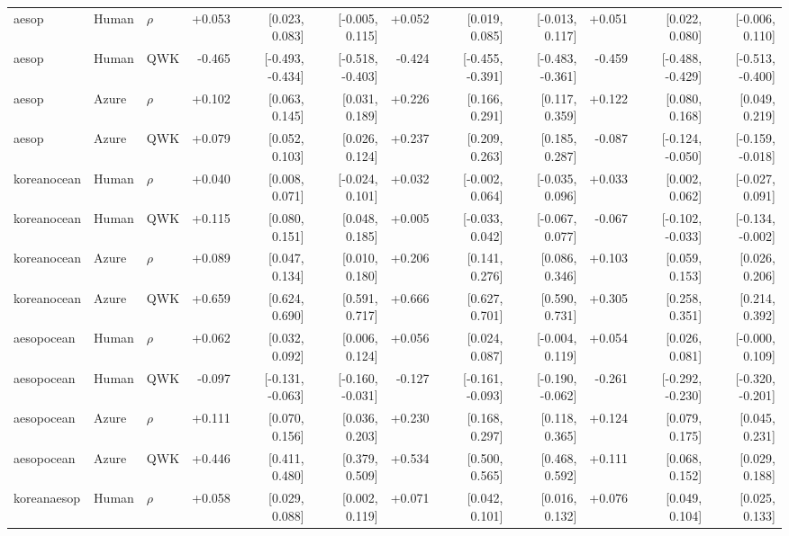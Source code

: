 \begin{landscape}
\begin{longtable}{@{}lllrrrrrrrrr@{}}
\addlinespace[2pt]
aesop & Human & $\rho$ & +0.053 & [0.023, 0.083] & [-0.005, 0.115] & +0.052 & [0.019, 0.085] & [-0.013, 0.117] & +0.051 & [0.022, 0.080] & [-0.006, 0.110]\\
aesop & Human & QWK & -0.465 & [-0.493, -0.434] & [-0.518, -0.403] & -0.424 & [-0.455, -0.391] & [-0.483, -0.361] & -0.459 & [-0.488, -0.429] & [-0.513, -0.400]\\
aesop & Azure & $\rho$ & +0.102 & [0.063, 0.145] & [0.031, 0.189] & +0.226 & [0.166, 0.291] & [0.117, 0.359] & +0.122 & [0.080, 0.168] & [0.049, 0.219]\\
aesop & Azure & QWK & +0.079 & [0.052, 0.103] & [0.026, 0.124] & +0.237 & [0.209, 0.263] & [0.185, 0.287] & -0.087 & [-0.124, -0.050] & [-0.159, -0.018]\\
\addlinespace[2pt]
koreanocean & Human & $\rho$ & +0.040 & [0.008, 0.071] & [-0.024, 0.101] & +0.032 & [-0.002, 0.064] & [-0.035, 0.096] & +0.033 & [0.002, 0.062] & [-0.027, 0.091]\\
koreanocean & Human & QWK & +0.115 & [0.080, 0.151] & [0.048, 0.185] & +0.005 & [-0.033, 0.042] & [-0.067, 0.077] & -0.067 & [-0.102, -0.033] & [-0.134, -0.002]\\
koreanocean & Azure & $\rho$ & +0.089 & [0.047, 0.134] & [0.010, 0.180] & +0.206 & [0.141, 0.276] & [0.086, 0.346] & +0.103 & [0.059, 0.153] & [0.026, 0.206]\\
koreanocean & Azure & QWK & +0.659 & [0.624, 0.690] & [0.591, 0.717] & +0.666 & [0.627, 0.701] & [0.590, 0.731] & +0.305 & [0.258, 0.351] & [0.214, 0.392]\\
\addlinespace[2pt]
aesopocean & Human & $\rho$ & +0.062 & [0.032, 0.092] & [0.006, 0.124] & +0.056 & [0.024, 0.087] & [-0.004, 0.119] & +0.054 & [0.026, 0.081] & [-0.000, 0.109]\\
aesopocean & Human & QWK & -0.097 & [-0.131, -0.063] & [-0.160, -0.031] & -0.127 & [-0.161, -0.093] & [-0.190, -0.062] & -0.261 & [-0.292, -0.230] & [-0.320, -0.201]\\
aesopocean & Azure & $\rho$ & +0.111 & [0.070, 0.156] & [0.036, 0.203] & +0.230 & [0.168, 0.297] & [0.118, 0.365] & +0.124 & [0.079, 0.175] & [0.045, 0.231]\\
aesopocean & Azure & QWK & +0.446 & [0.411, 0.480] & [0.379, 0.509] & +0.534 & [0.500, 0.565] & [0.468, 0.592] & +0.111 & [0.068, 0.152] & [0.029, 0.188]\\
\addlinespace[2pt]
koreanaesop & Human & $\rho$ & +0.058 & [0.029, 0.088] & [0.002, 0.119] & +0.071 & [0.042, 0.101] & [0.016, 0.132] & +0.076 & [0.049, 0.104] & [0.025, 0.133]\\

\end{longtable}
\end{landscape}
